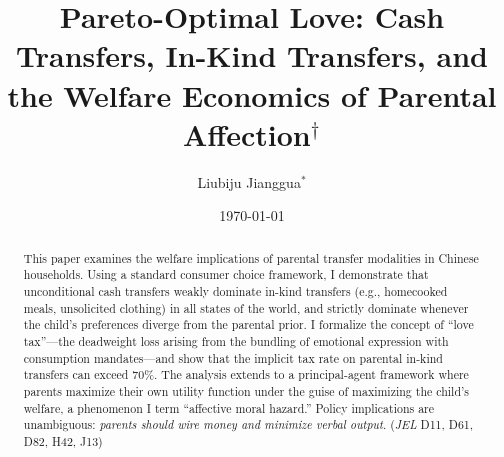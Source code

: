 \documentclass[AER]{AEA}
\begin{document}
\title{Pareto-Optimal Love: Cash Transfers, In-Kind Transfers, and the Welfare Economics of Parental Affection$^\dagger$}

\author{Liubiju Jianggua$^*$}
\date{\today}

\begin{abstract}
This paper examines the welfare implications of parental transfer modalities in Chinese households. Using a standard consumer choice framework, I demonstrate that unconditional cash transfers weakly dominate in-kind transfers (e.g., homecooked meals, unsolicited clothing) in all states of the world, and strictly dominate whenever the child's preferences diverge from the parental prior. I formalize the concept of ``love tax''---the deadweight loss arising from the bundling of emotional expression with consumption mandates---and show that the implicit tax rate on parental in-kind transfers can exceed 70\%. The analysis extends to a principal-agent framework where parents maximize their own utility function under the guise of maximizing the child's welfare, a phenomenon I term ``affective moral hazard.'' Policy implications are unambiguous: \textit{parents should wire money and minimize verbal output}.
\noindent (\textit{JEL} D11, D61, D82, H42, J13) \\
\end{abstract}

\maketitle

\let\thefootnote\relax{}
\let\thefootnote\relax{}
\end{document}
